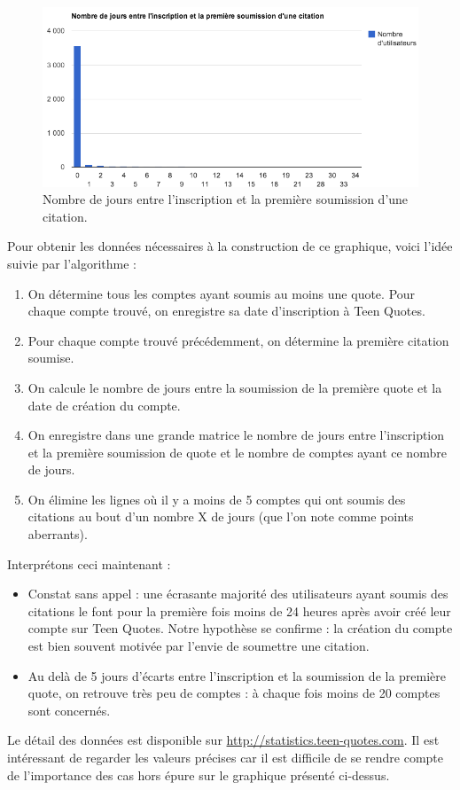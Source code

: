 \documentclass{report}
\begin{document}
	\begin{figure}[H]
		\center
		\includegraphics[width=450px]{images/inscriptionSoumissionQuote.png}
		\caption{Nombre de jours entre l'inscription et la première soumission d'une citation.}
	\end{figure}
	Pour obtenir les données nécessaires à la construction de ce graphique, voici l'idée suivie par l'algorithme :
	\vspace{10px}
	\begin{enumerate}
		\item On détermine tous les comptes ayant soumis au moins une quote. Pour chaque compte trouvé, on enregistre sa date d'inscription à Teen Quotes.
		\item Pour chaque compte trouvé précédemment, on détermine la première citation soumise.
		\item On calcule le nombre de jours entre la soumission de la première quote et la date de création du compte.
		\item On enregistre dans une grande matrice le nombre de jours entre l'inscription et la première soumission de quote et le nombre de comptes ayant ce nombre de jours.
		\item On élimine les lignes où il y a moins de 5 comptes qui ont soumis des citations au bout d'un nombre X de jours (que l'on note comme points aberrants).
	\end{enumerate}
	\vspace{10px}
	Interprétons ceci maintenant :
	\vspace{10px}
	\begin{itemize}
		\item Constat sans appel : une écrasante majorité des utilisateurs ayant soumis des citations le font pour la première fois moins de 24 heures après avoir créé leur compte sur Teen Quotes. Notre hypothèse se confirme : la création du compte est bien souvent motivée par l'envie de soumettre une citation.
		\item Au delà de 5 jours d'écarts entre l'inscription et la soumission de la première quote, on retrouve très peu de comptes : à chaque fois moins de 20 comptes sont concernés.  
	\end{itemize}
	\vspace{10px}
	Le détail des données est disponible sur \url{http://statistics.teen-quotes.com}. Il est intéressant de regarder les valeurs précises car il est difficile de se rendre compte de l'importance des cas hors épure sur le graphique présenté ci-dessus.
\end{document}
